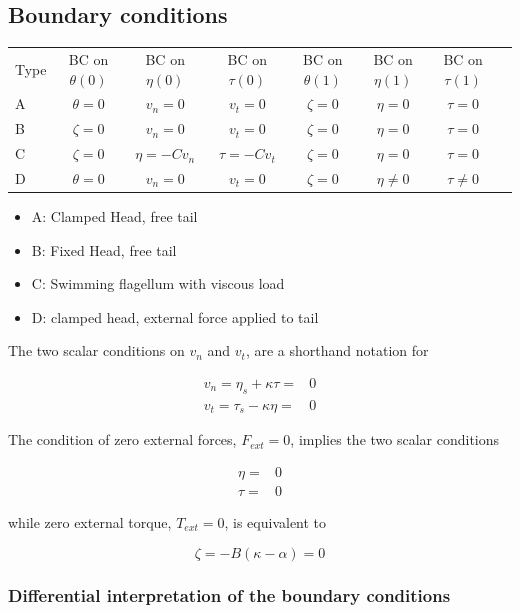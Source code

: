 \documentclass[12pt]{article}
\begin{document}
\subsection{Boundary conditions}\label{boundary-conditions}

\begin{tabular}{l|c|c|c|c||c|c|c|}
  Type & BC on $\theta(0)$ & BC on $\eta(0)$ & BC on $\tau(0)$ & BC on $\theta(1)$ & BC on $\eta(1)$ & BC on $\tau(1)$ \\
  A & $\theta = 0$ & $v_n = 0$ & $v_t=0$ & $\zeta = 0$ &  $\eta = 0$& $\tau = 0$  \\
  B & $\zeta = 0$ & $v_n = 0$ & $v_t=0$  & $\zeta = 0$&  $\eta = 0$& $\tau = 0$ \\
  C &  $\zeta = 0$ & $\eta = -C v_n$& $\tau =  -C v_t$ & $\zeta = 0$&  $\eta = 0$& $\tau = 0$ \\
  D  &  $\theta = 0$ & $v_n = 0$& $v_t=0$ & $\zeta = 0$& $\eta \neq 0$& $\tau \neq 0$ 
\end{tabular}


\begin{itemize}
\item A: Clamped Head, free tail
\item B: Fixed Head, free tail
\item C: Swimming flagellum with viscous load 
\item D: clamped head, external force applied to tail
\end{itemize}

The two scalar conditions on $v_n$ and $v_t$, are a shorthand notation for

$$
\begin{aligned}
v_n = \eta_s + \kappa \tau = & 0 \\
v_t = \tau_s - \kappa \eta = & 0
\end{aligned}
$$

The condition of zero external forces, $F_{ext} = 0$, implies the two scalar conditions

$$
\begin{aligned}
\eta = &0 \\
\tau = &0
\end{aligned}
$$

while zero external torque, $T_{ext} = 0$, is equivalent to 

$$
\zeta = -B(\kappa-\alpha) = 0
$$

\subsubsection{Differential interpretation of the boundary
conditions}\label{differential-interpretation-of-the-boundary-conditions}
\end{document}
